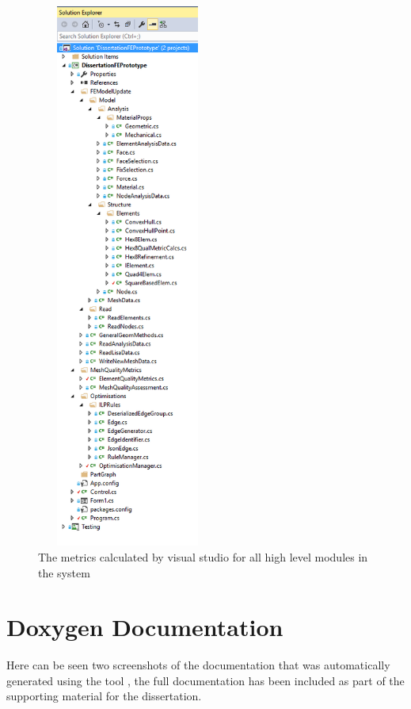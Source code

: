 \begin{figure}[H]
  \centerline{\includegraphics[width=60mm, height=180mm, scale=0.25]{../Graphics/VSolutionExplorer.png}}
  \caption{The metrics calculated by visual studio for all high level modules in the system}
\end{figure}



\newpage
\section{Doxygen Documentation}
Here can be seen two screenshots of the documentation that was automatically generated using the tool , the full documentation has been included as part of the supporting material for the dissertation. 


